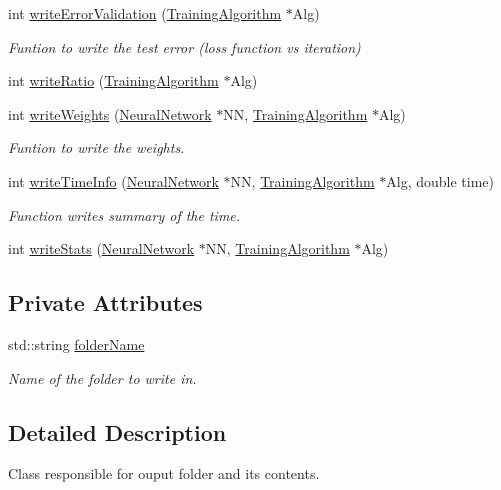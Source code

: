 \begin{DoxyCompactItemize}
int \hyperlink{classOutWriter_adaddf5f3ca232f83a077e1ea6256ea42}{write\+Error\+Validation} (\hyperlink{classTrainingAlgorithm}{Training\+Algorithm} $\ast$Alg)
\begin{DoxyCompactList}\small\item\em Funtion to write the test error (loss function vs iteration) \end{DoxyCompactList}\item 
int \hyperlink{classOutWriter_a1727aa374e26a570e65cb2a6e65be824}{write\+Ratio} (\hyperlink{classTrainingAlgorithm}{Training\+Algorithm} $\ast$Alg)
\item 
int \hyperlink{classOutWriter_a485c7ad7d1430a57c1c405ac8c2799c2}{write\+Weights} (\hyperlink{classNeuralNetwork}{Neural\+Network} $\ast$NN, \hyperlink{classTrainingAlgorithm}{Training\+Algorithm} $\ast$Alg)
\begin{DoxyCompactList}\small\item\em Funtion to write the weights. \end{DoxyCompactList}\item 
int \hyperlink{classOutWriter_a7a90b49d2b4c0e5e5574dd737415ef11}{write\+Time\+Info} (\hyperlink{classNeuralNetwork}{Neural\+Network} $\ast$NN, \hyperlink{classTrainingAlgorithm}{Training\+Algorithm} $\ast$Alg, double time)
\begin{DoxyCompactList}\small\item\em Function writes summary of the time. \end{DoxyCompactList}\item 
int \hyperlink{classOutWriter_afdc9e47d8cf0e485a678d79cd0491519}{write\+Stats} (\hyperlink{classNeuralNetwork}{Neural\+Network} $\ast$NN, \hyperlink{classTrainingAlgorithm}{Training\+Algorithm} $\ast$Alg)
\end{DoxyCompactItemize}
\subsection*{Private Attributes}
\begin{DoxyCompactItemize}
\item 
std\+::string \hyperlink{classOutWriter_a940fc333f7793f43438e0a89afa225d4}{folder\+Name}
\begin{DoxyCompactList}\small\item\em Name of the folder to write in. \end{DoxyCompactList}\end{DoxyCompactItemize}


\subsection{Detailed Description}
Class responsible for ouput folder and its contents. 

